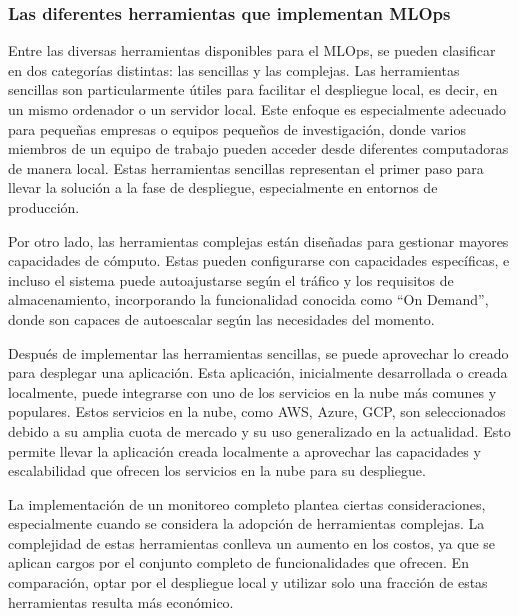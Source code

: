 \subsubsection{Las diferentes herramientas que implementan MLOps}

Entre las diversas herramientas disponibles para el MLOps, se pueden clasificar en dos categorías distintas: las sencillas y las complejas. Las herramientas sencillas son particularmente útiles para facilitar el despliegue local, es decir, en un mismo ordenador o un servidor local. Este enfoque es especialmente adecuado para pequeñas empresas o equipos pequeños de investigación, donde varios miembros de un equipo de trabajo pueden acceder desde diferentes computadoras de manera local. Estas herramientas sencillas representan el primer paso para llevar la solución a la fase de despliegue, especialmente en entornos de producción. \newline

Por otro lado, las herramientas complejas están diseñadas para gestionar mayores capacidades de cómputo. Estas pueden configurarse con capacidades específicas, e incluso el sistema puede autoajustarse según el tráfico y los requisitos de almacenamiento, incorporando la funcionalidad conocida como ``On Demand'', donde son capaces de autoescalar según las necesidades del momento. \newline

\newpage

Después de implementar las herramientas sencillas, se puede aprovechar lo creado para desplegar una aplicación. Esta aplicación, inicialmente desarrollada o creada localmente, puede integrarse con uno de los servicios en la nube más comunes y populares. Estos servicios en la nube, como AWS, Azure, GCP, son seleccionados debido a su amplia cuota de mercado y su uso generalizado en la actualidad. Esto permite llevar la aplicación creada localmente a aprovechar las capacidades y escalabilidad que ofrecen los servicios en la nube para su despliegue. \newline

La implementación de un monitoreo completo plantea ciertas consideraciones, especialmente cuando se considera la adopción de herramientas complejas. La complejidad de estas herramientas conlleva un aumento en los costos, ya que se aplican cargos por el conjunto completo de funcionalidades que ofrecen. En comparación, optar por el despliegue local y utilizar solo una fracción de estas herramientas resulta más económico. \newline

